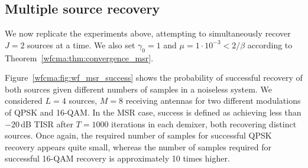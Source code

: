 \subsection{Multiple source recovery} \label{wfcma:sim:MSR} 

We now replicate the experiments above, attempting to simultaneously
recover $J=2$ sources at a time. We also set $\gamma_0=1$ and $\mu=1\cdot10^{-3}<2/\beta$ according to Theorem~\ref{wfcma:thm:convergence_msr}.

Figure~\ref{wfcma:fig:wf_msr_success} shows the probability of successful recovery of both sources given different numbers of samples in a noiseless system. 
We considered $L=4$ sources, $M=8$ receiving antennas for two different modulations of QPSK and 16-QAM. 
In the MSR case, success is defined as achieving less than $-20\,$dB TISR after $T=1000$ iterations in each demixer, both recovering distinct sources. 
Once again, the required number of samples for successful QPSK recovery appears quite small, whereas the number of samples required for successful 16-QAM recovery is approximately 10 times higher.

